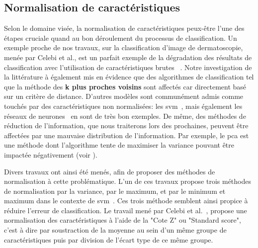 \subsection{Normalisation de caractéristiques}
Selon le domaine visée, la normalisation de caractéristiques peux-être l'une des étapes cruciale quand au bon déroulement du processus de classification. Un exemple proche de nos travaux, sur la classification d'image de dermatoscopie, menée par Celebi et al., est un parfait exemple de la dégradation des résultats de classification avec l'utilisation de caractéristiques brutes ~\cite{Celebi2007}. Notre investigation de la littérature à également mis en évidence que des algorithmes de classification tel que la méthode des \textbf{k plus proches voisins} sont affectés car directement basé sur un critère de distance. D'autres modèles sont communément admis comme touchés par des caractéristiques non normalisées: les \gls{svm}~\cite{Juszczak2002}, mais également les réseaux de neurones~\cite{Celebi2007} en sont de très bon exemples. De même, des méthodes de réduction de l'information, que nous traiterons lors des prochaines, peuvent être affectées par une mauvaise distribution de l'information. Par exemple, le \gls{pca} est une méthode dont l'algorithme tente de maximiser la variance pouvant être impactée négativement (voir ).\par

Divers travaux ont ainsi été menés, afin de proposer des méthodes de normalisation à cette problématique. L'un de ces travaux propose trois méthodes de normalisation par la variance, par le maximum, et par le minimum et maximum dans le contexte de \gls{svm}~\cite{Juszczak2002}. Ces trois méthode semblent ainsi propice à réduire l'erreur de classification. Le travail mené par Celebi et al.~\cite{Celebi2007}, propose une normalisation des caractéristiques à l'aide de la "Cote Z" ou "Standard score", c'est à dire par soustraction de la moyenne au sein d'un même groupe de caractéristiques puis par division de l'écart type de ce même groupe.\par

